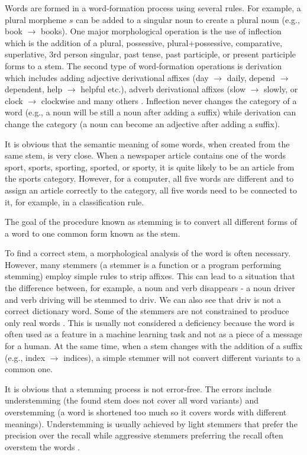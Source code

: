 \documentclass[11pt,openany,executivepaper]{book}
\begin{document}
Words are formed in a word-formation process using several rules. For example, a plural morpheme $s$ can be added to a singular noun to create a plural noun (e.g., book $\rightarrow$ books). One major morphological operation is the use of inflection which is the addition of a plural, possessive, plural+possessive, comparative, superlative, 3rd person singular, past tense, past participle, or present participle forms to a stem. The second type of word-formation operations is derivation which includes adding adjective derivational affixes (day $\rightarrow$ daily, depend $\rightarrow$ dependent, help $\rightarrow$ helpful etc.), adverb derivational affixes (slow $\rightarrow$ slowly, or clock $\rightarrow$ clockwise and many others \cite{126}. Inflection never changes the category of a word (e.g., a noun will be still a noun after adding a suffix) while derivation can change the category (a noun can become an adjective after adding a suffix).

It is obvious that the semantic meaning of some words, when created from the same stem, is very close. When a newspaper article contains one of the words sport, sports, sporting, sported, or sporty, it is quite likely to be an article from the sports category. However, for a computer, all five words are different and to assign an article correctly to the category, all five words need to be connected to it, for example, in a classification rule.

The goal of the procedure known as stemming is to convert all different forms of a word to one common form known as the stem.

To find a correct stem, a morphological analysis of the word is often necessary. However, many stemmers (a stemmer is a function or a program performing stemming) employ simple rules to strip affixes. This can lead to a situation that the difference between, for example, a noun and verb disappears - a noun driver and verb driving will be stemmed to driv. We can also see that driv is not a correct dictionary word. Some of the stemmers are not constrained to produce only real words \cite{189}. This is usually not considered a deficiency because the word is often used as a feature in a machine learning task and not as a piece of a message for a human. At the same time, when a stem changes with the addition of a suffix (e.g., index $\rightarrow$ indices), a simple stemmer will not convert different variants to a common one.

It is obvious that a stemming process is not error-free. The errors include understemming (the found stem does not cover all word variants) and overstemming (a word is shortened too much so it covers words with different meanings). Understemming is usually achieved by light stemmers that prefer the precision over the recall while aggressive stemmers preferring the recall often overstem the words \cite{39}.
\end{document}
